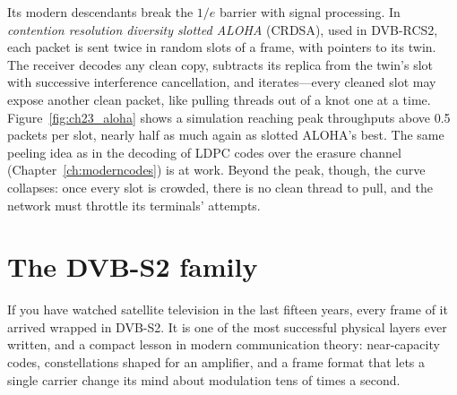 Its modern descendants break the $1/e$ barrier with signal processing. In \emph{contention
resolution diversity slotted ALOHA} (CRDSA), used in DVB-RCS2, each packet is sent twice in random
slots of a frame, with pointers to its twin. The receiver decodes any clean copy, subtracts its
replica from the twin's slot with successive interference cancellation, and iterates---every
cleaned slot may expose another clean packet, like pulling threads out of a knot one at a time.
Figure~\ref{fig:ch23_aloha} shows a simulation reaching peak throughputs above 0.5 packets per
slot, nearly half as much again as slotted ALOHA's best. The same peeling idea as in the
decoding of LDPC codes over the erasure channel (Chapter~\ref{ch:moderncodes}) is at work. Beyond
the peak, though, the curve collapses: once every slot is crowded, there is no clean thread to
pull, and the network must throttle its terminals' attempts.

\section{The DVB-S2 family}
\label{sec:ch23:dvbs2}

If you have watched satellite television in the last fifteen years, every frame of it arrived
wrapped in DVB-S2. It is one of the most successful physical layers ever written, and a compact
lesson in modern communication theory: near-capacity codes, constellations shaped for an
amplifier, and a frame format that lets a single carrier change its mind about modulation tens of
times a second.

